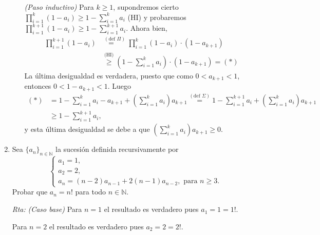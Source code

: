 \documentclass[a4paper,12pt,twoside,spanish,reqno]{amsbook}
\numberwithin{equation}{section}
\newcommand{\rta}{\noindent\textit{Rta: }}
\begin{document}
\begin{enumerate}[resume]
\begin{enumerate}
                \textit{(Paso inductivo) }  Para  $k \ge 1$,  supondremos cierto  $\prod_{i=1}^{k} (1-a_i) \ge 1 - \sum_{i=1}^{k} a_i$ (HI) y probaremos  $\prod_{i=1}^{k+1} (1-a_i) \ge 1 - \sum_{i=1}^{k+1} a_i$. Ahora bien, 
                \begin{align*}
                \prod_{i=1}^{k+1} (1-a_i) &\overset{(\text{def } \Pi)}{=\quad} \prod_{i=1}^{k} (1-a_i)\cdot (1-a_{k+1})\\
                &\overset{\text{(HI)}}{\ge}  (1 - \sum_{i=1}^{k} a_i)\cdot (1-a_{k+1}) =(*)
                \end{align*}
                La última desigualdad es verdadera, puesto  que como $0<a_{k+1}<1$, entonces $0<1-a_{k+1}<1$. 
                Luego
                \begin{align*}
                    (*)&= 1 - \sum_{i=1}^{k} a_i -a_{k+1} +  (\sum_{i=1}^{k} a_i)a_{k+1} \overset{(\text{def } \Sigma)}{=} 1 - \sum_{i=1}^{k+1} a_i +  (\sum_{i=1}^{k} a_i)a_{k+1} \\
                    &\ge  1 - \sum_{i=1}^{k+1} a_i,
                \end{align*}
                y  esta última desigualdad se debe a que $(\sum_{i=1}^{k} a_i)a_{k+1} \ge 0$.
            \end{enumerate}    

            \item   Sea $\{a_n\}_{n\in\mathbb N}$ la sucesión definida recursivamente por
            $$\begin{cases}
            a_1=1, \\a_2=2, \\a_{n} = (n-2)a_{n-1}+2(n-1)a_{n-2}, \text{ para $n\geq 3$}.
            \end{cases}$$
            Probar que $a_n=n!$ para todo $n\in \mathbb N$.

            \rta \textit{(Caso  base) } Para $n=1$ el resultado es verdadero pues $a_1 = 1 = 1!$.
        
            Para $n=2$ el resultado es verdadero pues $a_2 = 2 = 2!$.
            

\end{enumerate}
\end{document}
